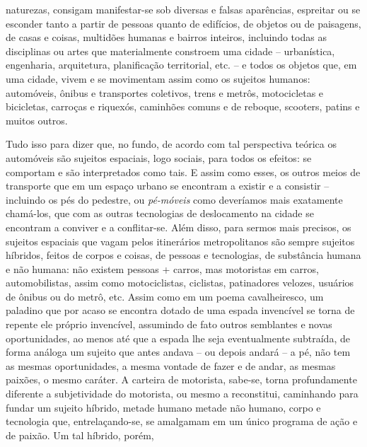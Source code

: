 \begin{multicols}{2}
naturezas,\allowbreak{} consigam manifestar-\allowbreak{}se sob diversas e falsas aparências,\allowbreak{} espreitar ou se esconder tanto a partir de pessoas quanto de edifícios,\allowbreak{} de objetos ou de paisagens,\allowbreak{} de casas e coisas,\allowbreak{} multidões humanas e bairros inteiros,\allowbreak{} incluindo todas as disciplinas ou artes que materialmente constroem uma cidade – urbanística,\allowbreak{} engenharia,\allowbreak{} arquitetura,\allowbreak{} planificação territorial,\allowbreak{} etc.\allowbreak{} – e todos os objetos que,\allowbreak{} em uma cidade,\allowbreak{} vivem e se movimentam assim como os sujeitos humanos:\allowbreak{} automóveis,\allowbreak{} ônibus e transportes coletivos,\allowbreak{} trens e metrôs,\allowbreak{} motocicletas e bicicletas,\allowbreak{} carroças e riquexós,\allowbreak{} caminhões comuns e de reboque,\allowbreak{} scooters,\allowbreak{} patins e muitos outros.\allowbreak{}\par{}Tudo isso para dizer que,\allowbreak{} no fundo,\allowbreak{} de acordo com tal perspectiva teórica os automóveis são sujeitos espaciais,\allowbreak{} logo sociais,\allowbreak{} para todos os efeitos:\allowbreak{} se comportam e são interpretados como tais.\allowbreak{} E assim como esses,\allowbreak{} os outros meios de transporte que em um espaço urbano se encontram a existir e a consistir – incluindo os pés do pedestre,\allowbreak{} ou \textit{pé-\allowbreak{}móveis} como deveríamos mais exatamente chamá-\allowbreak{}los,\allowbreak{} que com as outras tecnologias de deslocamento na cidade se encontram a conviver e a conflitar-\allowbreak{}se.\allowbreak{} Além disso,\allowbreak{} para sermos mais precisos,\allowbreak{} os sujeitos espaciais que vagam pelos itinerários metropolitanos são sempre sujeitos híbridos,\allowbreak{} feitos de corpos e coisas,\allowbreak{} de pessoas e tecnologias,\allowbreak{} de substância humana e não humana:\allowbreak{} não existem pessoas +\allowbreak{} carros,\allowbreak{} mas motoristas em carros,\allowbreak{} automobilistas,\allowbreak{} assim como motociclistas,\allowbreak{} ciclistas,\allowbreak{} patinadores velozes,\allowbreak{} usuários de ônibus ou do metrô,\allowbreak{} etc.\allowbreak{} Assim como em um poema cavalheiresco,\allowbreak{} um paladino que por acaso se encontra dotado de uma espada invencível se torna de repente ele próprio invencível,\allowbreak{} assumindo de fato outros semblantes e novas oportunidades,\allowbreak{} ao menos até que a espada lhe seja eventualmente subtraída,\allowbreak{} de forma análoga um sujeito que antes andava – ou depois andará – a pé,\allowbreak{} não tem as mesmas oportunidades,\allowbreak{} a mesma vontade de fazer e de andar,\allowbreak{} as mesmas paixões,\allowbreak{} o mesmo caráter.\allowbreak{} A carteira de motorista,\allowbreak{} sabe-\allowbreak{}se,\allowbreak{} torna profundamente diferente a subjetividade do motorista,\allowbreak{} ou mesmo a reconstitui,\allowbreak{} caminhando para fundar um sujeito híbrido,\allowbreak{} metade humano metade não humano,\allowbreak{} corpo e tecnologia que,\allowbreak{} entrelaçando-\allowbreak{}se,\allowbreak{} se amalgamam em um único programa de ação e de paixão.\allowbreak{} Um tal híbrido,\allowbreak{} porém,\allowbreak{} 
\end{multicols}

